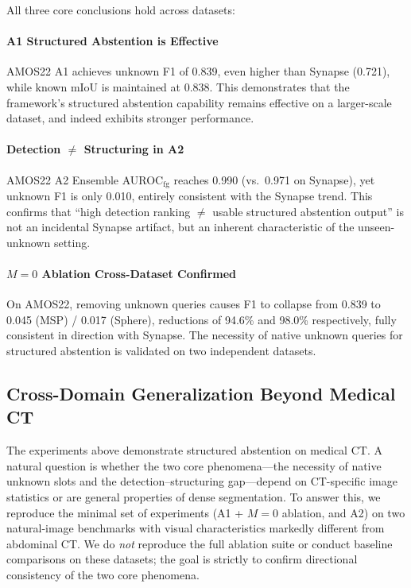 \documentclass[3p,twocolumn,authoryear]{elsarticle}
\begin{document}
All three core conclusions hold across datasets:

\paragraph{A1 Structured Abstention is Effective}
AMOS22 A1 achieves unknown F1 of 0.839, even higher than Synapse (0.721),
while known mIoU is maintained at 0.838.
This demonstrates that the framework's structured abstention capability remains
effective on a larger-scale dataset, and indeed exhibits stronger performance.

\paragraph{Detection $\neq$ Structuring in A2}
AMOS22 A2 Ensemble AUROC$_{\text{fg}}$ reaches 0.990 (vs.\ 0.971 on Synapse),
yet unknown F1 is only 0.010, entirely consistent with the Synapse trend.
This confirms that ``high detection ranking $\neq$ usable structured abstention output''
is not an incidental Synapse artifact, but an inherent characteristic of the
unseen-unknown setting.

\paragraph{$M=0$ Ablation Cross-Dataset Confirmed}
On AMOS22, removing unknown queries causes F1 to collapse from 0.839 to 0.045 (MSP)
/ 0.017 (Sphere), reductions of 94.6\% and 98.0\% respectively, fully consistent in
direction with Synapse.
The necessity of native unknown queries for structured abstention is validated on two
independent datasets.


\subsection{Cross-Domain Generalization Beyond Medical CT}\label{sec:exp:crossdomain}

The experiments above demonstrate structured abstention on medical CT.
A natural question is whether the two core phenomena---the necessity of native unknown
slots and the detection--structuring gap---depend on CT-specific image statistics or
are general properties of dense segmentation.
To answer this, we reproduce the minimal set of experiments (A1 + $M{=}0$ ablation,
and A2) on two natural-image benchmarks with visual characteristics markedly different
from abdominal CT.
We do \emph{not} reproduce the full ablation suite or conduct baseline comparisons
on these datasets; the goal is strictly to confirm directional consistency of the
two core phenomena.
\end{document}
